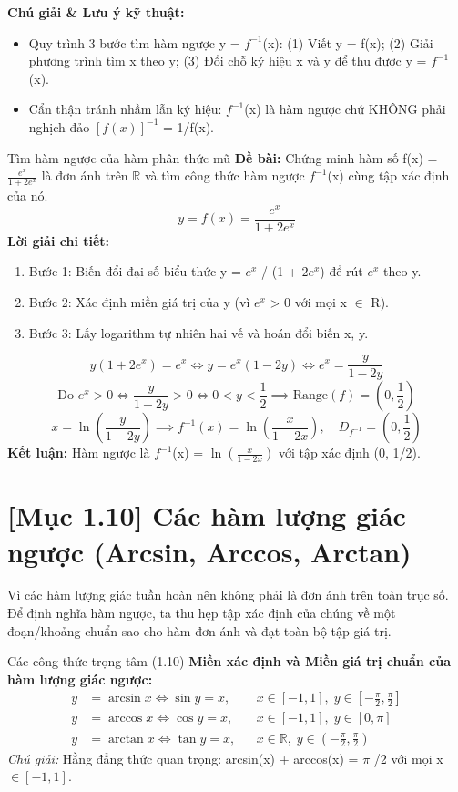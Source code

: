 \documentclass[11pt,a4paper,oneside]{book}
\begin{document}
\noindent\textbf{Chú giải \& Lưu ý kỹ thuật:}
\begin{itemize}[leftmargin=1.5em, itemsep=2pt]
  \item Quy trình 3 bước tìm hàm ngược y = $f^{-1}$(x): (1) Viết y = f(x); (2) Giải phương trình tìm x theo y; (3) Đổi chỗ ký hiệu x và y để thu được y = $f^{-1}$(x).
  \item Cẩn thận tránh nhầm lẫn ký hiệu: $f^{-1}$(x) là hàm ngược chứ KHÔNG phải nghịch đảo $[f(x)]^{-1}$ = 1/f(x).
\end{itemize}

\begin{vidu}{Tìm hàm ngược của hàm phân thức mũ}
\textbf{Đề bài:} Chứng minh hàm số f(x) = $\frac{e^x}{1 + 2e^x}$ là đơn ánh trên $\mathbb{R}$ và tìm công thức hàm ngược $f^{-1}$(x) cùng tập xác định của nó.
\[ y = f(x) = \frac{e^x}{1 + 2e^x} \]
\textbf{Lời giải chi tiết:}
\begin{enumerate}[leftmargin=1.5em, itemsep=2pt]
  \item Bước 1: Biến đổi đại số biểu thức y = $e^x$ / (1 + $2e^x$) để rút $e^x$ theo y.
  \item Bước 2: Xác định miền giá trị của y (vì $e^x$ > 0 với mọi x $\in$  R).
  \item Bước 3: Lấy logarithm tự nhiên hai vế và hoán đổi biến x, y.
\end{enumerate}
\[ y(1 + 2e^x) = e^x \iff y = e^x(1 - 2y) \iff e^x = \frac{y}{1 - 2y} \]
\[ \text{Do } e^x > 0 \iff \frac{y}{1 - 2y} > 0 \iff 0 < y < \frac{1}{2} \implies \text{Range}(f) = \left(0, \frac{1}{2}\right) \]
\[ x = \ln\left(\frac{y}{1 - 2y}\right) \implies f^{-1}(x) = \ln\left(\frac{x}{1 - 2x}\right), \quad D_{f^{-1}} = \left(0, \frac{1}{2}\right) \]
\noindent\textbf{Kết luận:} Hàm ngược là $f^{-1}$(x) = $\ln\left(\frac{x}{1 - 2x}\right)$ với tập xác định (0, 1/2).
\end{vidu}

\section{[Mục 1.10] Các hàm lượng giác ngược (Arcsin, Arccos, Arctan)}
Vì các hàm lượng giác tuần hoàn nên không phải là đơn ánh trên toàn trục số. Để định nghĩa hàm ngược, ta thu hẹp tập xác định của chúng về một đoạn/khoảng chuẩn sao cho hàm đơn ánh và đạt toàn bộ tập giá trị.

\begin{congthuc}{Các công thức trọng tâm (1.10)}
\noindent\textbf{Miền xác định và Miền giá trị chuẩn của hàm lượng giác ngược:}
\[ \begin{aligned} y &= \arcsin x \iff \sin y = x, && x \in [-1, 1], \; y \in \left[-\frac{\pi}{2}, \frac{\pi}{2}\right] \\ y &= \arccos x \iff \cos y = x, && x \in [-1, 1], \; y \in [0, \pi] \\ y &= \arctan x \iff \tan y = x, && x \in \mathbb{R}, \; y \in \left(-\frac{\pi}{2}, \frac{\pi}{2}\right) \end{aligned} \]
\noindent\textit{Chú giải:} Hằng đẳng thức quan trọng: arcsin(x) + arccos(x) = $\pi$ /2 với mọi x $\in  [-1, 1]$.\\[4pt]
\end{congthuc}
\end{document}
